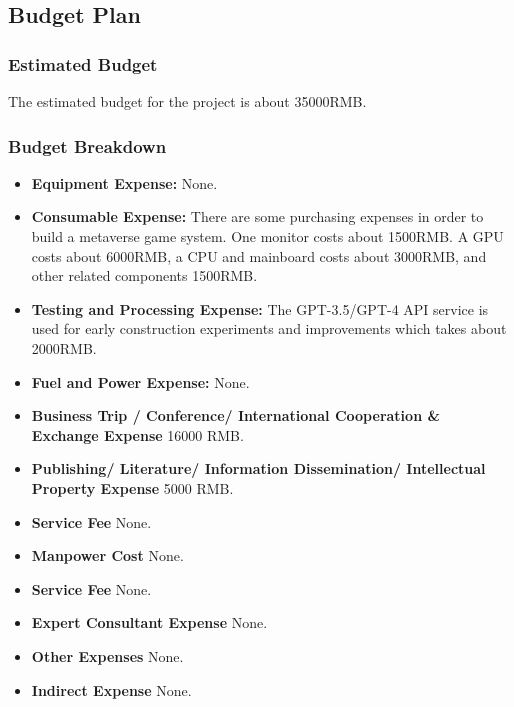 \subsection{Budget Plan}

\subsubsection{Estimated Budget}
The estimated budget for the project is about 35000RMB.

\subsubsection{Budget Breakdown}

\begin{itemize}
    \item \textbf{Equipment Expense:} 
    None.
    \item \textbf{Consumable Expense:} 
    There are some purchasing expenses in order to build a metaverse game system. One monitor costs about 1500RMB. 
    A GPU costs about 6000RMB, a CPU and mainboard costs about 3000RMB, and other related components 1500RMB. 
    \item \textbf{Testing and Processing Expense:} 
    The GPT-3.5/GPT-4 API service is used for early construction experiments and improvements which takes about 2000RMB.
    \item \textbf{Fuel and Power Expense:} 
    None.
    \item \textbf{Business Trip / Conference/ International Cooperation \& Exchange Expense} 
    16000 RMB.
    \item \textbf{Publishing/ Literature/ Information Dissemination/ Intellectual Property Expense} 
    5000 RMB.
    \item \textbf{Service Fee} 
    None.
    \item \textbf{Manpower Cost} 
    None.
    \item \textbf{Service Fee} 
    None.
    \item \textbf{Expert Consultant Expense} 
    None.
    \item \textbf{Other Expenses} 
    None.
    \item \textbf{Indirect Expense} 
    None.
\end{itemize}


